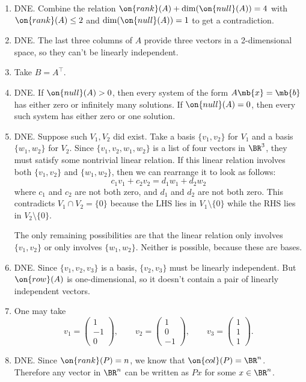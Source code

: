 \documentclass[10pt]{amsart}
\theoremstyle{mythm}
\theoremstyle{definition}
\theoremstyle{myrmk}
\begin{document}
	\begin{enumerate}
		\item DNE. Combine the relation $\on{rank}(A) + \dim(\on{null}(A)) = 4$ with $\on{rank}(A) \le 2$ and $\dim(\on{null}(A)) = 1$ to get a contradiction. 
		\item DNE. The last three columns of $A$ provide three vectors in a 2-dimensional space, so they can't be linearly independent. 
		\item Take $B = A^\top$. 
		\item DNE. If $\on{null}(A) > 0$, then every system of the form $A\mb{x} = \mb{b}$ has either zero or infinitely many solutions. If $\on{null}(A) = 0$, then every such system has either zero or one solution. 
		\item DNE. Suppose such $V_1, V_2$ did exist. Take a basis $\{v_1, v_2\}$ for $V_1$ and a basis $\{w_1, w_2\}$ for $V_2$. Since $\{v_1, v_2, w_1, w_2\}$ is a list of four vectors in $\BR^3$, they must satisfy some nontrivial linear relation. If this linear relation involves both $\{v_1, v_2\}$ and $\{w_1, w_2\}$, then we can rearrange it to look as follows: 
		\[
			c_1v_1 + c_2v_2 = d_1w_1 + d_2w_2
		\]
		where $c_1$ and $c_2$ are not both zero, and $d_1$ and $d_2$ are not both zero. This contradicts $V_1 \cap V_2 = \{0\}$ because the LHS lies in $V_1 \setminus \{0\}$ while the RHS lies in $V_2 \setminus \{0\}$. 
		
		The only remaining possibilities are that the linear relation only involves $\{v_1, v_2\}$ or only involves $\{w_1, w_2\}$. Neither is possible, because these are bases. 
		\item DNE. Since $\{v_1, v_2, v_3\}$ is a basis, $\{v_2, v_3\}$ must be linearly independent. But $\on{row}(A)$ is one-dimensional, so it doesn't contain a pair of linearly independent vectors. 
		\item One may take  
		\[
			v_1 = \begin{pmatrix}
			1 \\ -1 \\ 0 
			\end{pmatrix}, \qquad v_2 = \begin{pmatrix}
			1 \\ 0 \\ -1
			\end{pmatrix}, \qquad v_3 = \begin{pmatrix}
			1 \\ 1 \\ 1
			\end{pmatrix}. 
		\]
		\item DNE. Since $\on{rank}(P) = n$, we know that $\on{col}(P) = \BR^n$. Therefore any vector in $\BR^n$ can be written as $Px$ for some $x \in \BR^n$. 
		

\end{enumerate}
\end{document}
